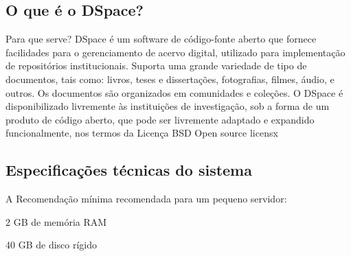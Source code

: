 \documentclass[12pt,hidelinks]{article}
\begin{document}
    
    

    
    
    
    
    
    
    
    

    
    

    
    
    
    
    
    
    
    
    
    
    
    
    
    
    
    
    
     
     

        

    
        
        
        
        
        
        
        
        
        
        
        
\newpage
        \subsection{O que é o DSpace?} 
        Para que serve?
        DSpace é um software de código-fonte aberto que fornece facilidades para o gerenciamento de acervo digital, utilizado para implementação de repositórios institucionais. Suporta uma grande variedade de tipo de documentos, tais como: livros, teses e dissertações, fotografias, filmes, áudio, e outros. Os documentos são organizados em comunidades e coleções.
        O DSpace é disponibilizado livremente às instituições de investigação, sob a forma de um produto de código aberto, que pode ser livremente adaptado e expandido funcionalmente, nos termos da Licença BSD Open source licensx

    \subsection{Especificações técnicas do sistema}
        A Recomendação mínima recomendada para um pequeno servidor:
        
    \singlespacing \textbullet \hspace{6pt} 2 GB de memória RAM
 
    \textbullet \hspace{6pt} 40 GB de disco rígido
 
\end{document}
